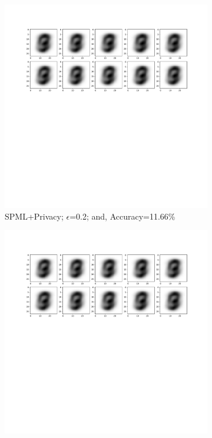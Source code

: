 \begin{figure}
\begin{subfigure}{.325\textwidth}
         \includegraphics[width=\textwidth]{images/Sim_attack/Mnistattack.2.pdf}
         \vspace{-8em}
         \caption{SPML+Privacy; $\epsilon$=0.2; and, Accuracy=11.66\%}
         \label{default}
     \end{subfigure}
     \begin{subfigure}{.325\textwidth}
         \includegraphics[width=\textwidth]{images/Sim_attack/Mnistattack1.pdf}

\end{subfigure}
\end{figure}

